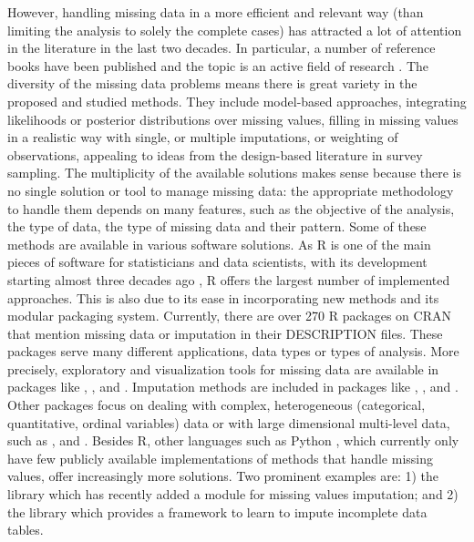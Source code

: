 However, handling missing data in a more efficient and relevant way (than
limiting the analysis to solely the complete cases) has attracted a lot of
attention in the literature in the last two decades. In particular, a number of
reference books have been published
\citep{Schafer2002,VanBuuren2012,Carpenter2012,little2019statistical} and the topic is an
active field of research \citep{josse_reiter_2018}. The diversity of the 
missing data problems means there is great variety in the proposed and studied methods. %
They include model-based approaches, integrating
likelihoods or posterior distributions over missing values, filling in missing values in a realistic way with single, or multiple
imputations, or weighting of observations, %
appealing to ideas from the design-based literature in survey
sampling.
The multiplicity of the available solutions makes sense because there is no single
solution or tool to manage missing data: the appropriate methodology to handle
them depends on many features, such as the objective of the analysis, the type of data, the type of
missing data and their pattern.
Some of these methods are
available in various software solutions. As R is one of the
main pieces of software for statisticians and data scientists, with its development starting almost three decades ago \citep{ihaka_1998}, R offers the largest number of implemented approaches. This is also due to
its ease in incorporating new methods and its modular packaging system.
Currently, there are over 270 {R} packages on CRAN that mention missing data
or imputation in their DESCRIPTION files. These packages serve many different
applications, data types or types of analysis. More precisely, exploratory
and visualization tools for missing data are available in packages like
, , and  \citep{naniar,Tierney2018,VIM,Cheng2015}.
Imputation methods are included in packages like , , and
 \citep{mice,amelia,mi}. Other packages focus on dealing with complex,
heterogeneous (categorical, quantitative, ordinal variables) data or with large
dimensional multi-level data, such as , and 
\citep{josse2016missmda,Murray2015}. %
Besides {R}, other languages such as {Python} \citep{python}, which currently only have few publicly available implementations of methods that handle missing values, offer increasingly more solutions. Two prominent  examples are: 1) the  library \citep{pedregosa2011scikit} which has recently added a module for missing values imputation; and 2) the  library \citep{datawig} which provides a framework to learn to impute incomplete data tables.


